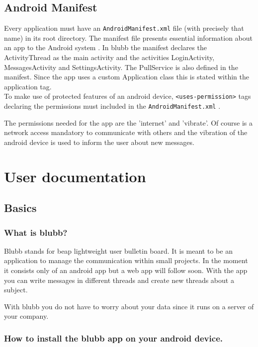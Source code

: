 \documentclass[12pt,a4paper,oneside]{report}
\newcommand{\appname}{blubb}
\newcommand{\beap}{beap}
\newcommand{\code}[1]{\lstinline{#1}}
\begin{document}
\section{Android Manifest}
Every application must have an \code{AndroidManifest.xml} file (with precisely that name) in its root directory. The manifest file presents essential information about an app to the Android system \citep{aDefManifest}.
In \appname{} the manifest declares the ActivityThread as the main activity and the activities LoginActivity, MessagesActivity and SettingsActivity. The PullService is also defined in the manifest. Since the app uses a custom Application class this is stated within the application tag.\\

To make use of protected features of an android device, \code{<uses-permission>} tags declaring the permissions must included in the \code{AndroidManifest.xml} \citep{aDefPermissions}.

The permissions needed for the app are the 'internet' and 'vibrate'. Of course is a network access mandatory to communicate with others and the vibration of the android device is used to inform the user about new messages. 

\chapter{User documentation}

\section{Basics}
\subsection{What is blubb?}
Blubb stands for \beap{} lightweight user bulletin board. It is meant to be an application to manage the communication within small projects. In the moment it consists only of an android app but a web app will follow soon. With the app you can write messages in different threads and create new threads about a subject. 

With \appname{} you do not have to worry about your data since it runs on a server of your company. 

\subsection{How to install the \appname{} app on your android device.}
\end{document}
